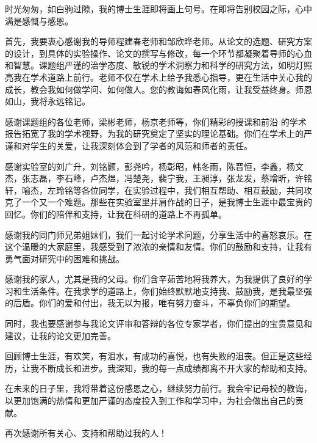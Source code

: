 \documentclass[
    anonymous,              %
    type = doctor,
  ]{njuthesis}
\begin{document}

\printbibliography


\begin{acknowledgement}
  时光匆匆，如白驹过隙，我的博士生涯即将画上句号。在即将告别校园之际，心中满是感慨与感恩。
  
  首先，我要衷心感谢我的导师程建春老师和邹欣晔老师。从论文的选题、研究方案的设计，到具体的实验操作、论文的撰写与修改，每一个环节都凝聚着导师的心血和智慧。课题组严谨的治学态度、敏锐的学术洞察力和科学的研究方法，如明灯照亮我在学术道路上前行。老师不仅在学术上给予我悉心指导，更在生活中关心我的成长，教会我如何做学问、如何做人。您的教诲如春风化雨，让我受益终身。师恩如山，我将永远铭记。
  
  感谢课题组的各位老师，梁彬老师，杨京老师等，你们精彩的授课和前沿
的学术报告拓宽了我的学术视野，为我的研究奠定了坚实的理论基础。你们在学术上的严谨和对学生的关爱，让我深刻体会到了学者的风范和师者的责任。
  
  感谢实验室的刘广升，刘铭颢，彭尧吟，杨彰昭，韩冬雨，陈晋恒，李鑫，杨文杰，张志磊，李石峰，卢杰煜，冯楚尧，裴宁我，王昶淳，张龙发，蔡增昕，许铭轩，喻杰，左玲铭等各位同学，在实验过程中，我们相互帮助、相互鼓励，共同攻克了一个又一个难题。那些在实验室里并肩作战的日子，是我博士生涯中最宝贵的回忆。你们的陪伴和支持，让我在科研的道路上不再孤单。
  
  感谢我的同门师兄弟姐妹们，我们一起讨论学术问题，分享生活中的喜怒哀乐。在这个温暖的大家庭里，我感受到了浓浓的亲情和友情。你们的鼓励和支持，让我有勇气面对研究中的困难和挑战。
  
  感谢我的家人，尤其是我的父母。你们含辛茹苦地将我养大，为我提供了良好的学习和生活条件。在我求学的道路上，你们始终默默地支持我、鼓励我，是我最坚强的后盾。你们的爱和付出，我无以为报，唯有努力奋斗，不辜负你们的期望。

  
  同时，我也要感谢参与我论文评审和答辩的各位专家学者，你们提出的宝贵意见和建议，让我的论文更加完善。
  
  回顾博士生涯，有欢笑，有泪水，有成功的喜悦，也有失败的沮丧。但正是这些经历，让我不断成长和进步。我深知，我的每一点成绩都离不开大家的帮助和支持。
  
  在未来的日子里，我将带着这份感恩之心，继续努力前行。我会牢记母校的教诲，以更加饱满的热情和更加严谨的态度投入到工作和学习中，为社会做出自己的贡献。
  
  再次感谢所有关心、支持和帮助过我的人！ 
\end{acknowledgement}
\end{document}

